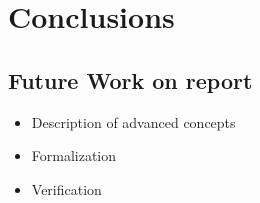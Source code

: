 \chapter{Conclusions}

\section{Future Work on report}
\begin{itemize}
  \item Description of advanced concepts
  \item Formalization
  \item Verification
\end{itemize}